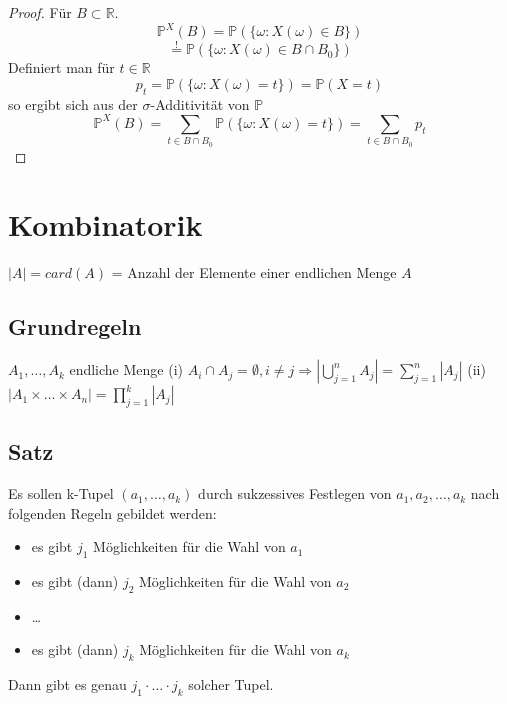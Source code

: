 \documentclass[a4paper,11pt,notitlepage]{report}
\newcommand{\R}{{\ensuremath{\mathbb{R}}}}
\newcommand{\Prim}{{\ensuremath{\mathbb{P}}}}
\begin{document}
\begin{proof}
Für $B \subset \R$.
\newline
$$\Prim^X(B) = \Prim(\{ \omega \colon X(\omega) \in B\})$$
$$\overset{!}{=} \Prim(\{\omega \colon X(\omega) \in B \cap B_0 \})$$
Definiert man für $t \in \R$
$$p_t = \Prim(\{\omega \colon X(\omega) = t\}) = \Prim(X = t)$$
so ergibt sich aus der $\sigma$-Additivität von $\Prim$
$$\Prim^X(B) = \sum\limits_{t \in B \cap B_0}{\Prim(\{\omega \colon X(\omega) = t \})} = \sum \limits_{t \in B \cap B_0}{p_t}$$
\end{proof}

\chapter{Kombinatorik}
$|A| = card(A)$ = Anzahl der Elemente einer endlichen Menge $A$

\section{Grundregeln}
$A_1, \ldots, A_k$ endliche Menge
\newline
(i) $A_i \cap A_j = \emptyset, i \neq j \Rightarrow \left|\bigcup\limits_{j=1}^{n}{A_j}\right| = \sum\limits_{j=1}^{n}{|A_j|}$
\newline
\label{grundregeln}
(ii) $|A_1 \times \ldots \times A_n| = \prod\limits_{j=1}^{k}{|A_j|}$

\section{Satz}
\label{urnen}
Es sollen k-Tupel $(a_1, \ldots, a_k)$ durch sukzessives Festlegen von $a_1,a_2,\ldots,a_k$ nach folgenden Regeln gebildet werden:
\begin{itemize}
	\item es gibt $j_1$ Möglichkeiten für die Wahl von $a_1$
	\item es gibt (dann) $j_2$ Möglichkeiten für die Wahl von $a_2$
	\item \ldots
	\item es gibt (dann) $j_k$ Möglichkeiten für die Wahl von $a_k$
\end{itemize}
Dann gibt es genau $j_1 \cdot \ldots \cdot j_k$ solcher Tupel.
\end{document}
